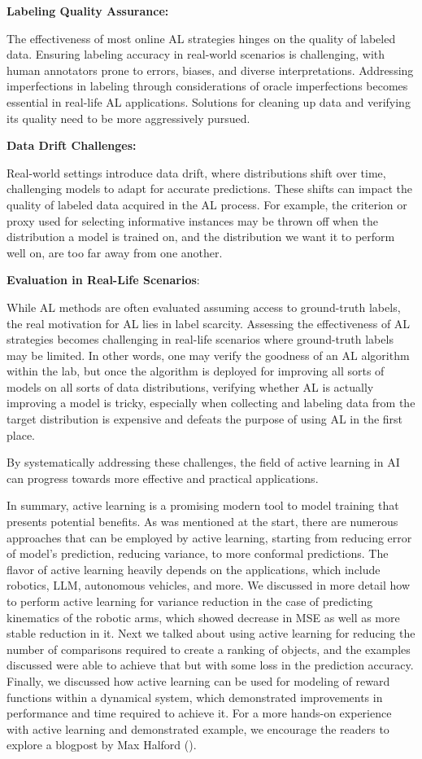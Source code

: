 \documentclass[
  letterpaper,
  numbers=noenddot,
  DIV=11]{scrreprt}
\theoremstyle{definition}
\theoremstyle{plain}
\theoremstyle{plain}
\theoremstyle{remark}
\begin{document}
\textbf{Labeling Quality Assurance:}

The effectiveness of most online AL strategies hinges on the quality of
labeled data. Ensuring labeling accuracy in real-world scenarios is
challenging, with human annotators prone to errors, biases, and diverse
interpretations. Addressing imperfections in labeling through
considerations of oracle imperfections becomes essential in real-life AL
applications. Solutions for cleaning up data and verifying its quality
need to be more aggressively pursued.

\textbf{Data Drift Challenges:}

Real-world settings introduce data drift, where distributions shift over
time, challenging models to adapt for accurate predictions. These shifts
can impact the quality of labeled data acquired in the AL process. For
example, the criterion or proxy used for selecting informative instances
may be thrown off when the distribution a model is trained on, and the
distribution we want it to perform well on, are too far away from one
another.

\textbf{Evaluation in Real-Life Scenarios}:

While AL methods are often evaluated assuming access to ground-truth
labels, the real motivation for AL lies in label scarcity. Assessing the
effectiveness of AL strategies becomes challenging in real-life
scenarios where ground-truth labels may be limited. In other words, one
may verify the goodness of an AL algorithm within the lab, but once the
algorithm is deployed for improving all sorts of models on all sorts of
data distributions, verifying whether AL is actually improving a model
is tricky, especially when collecting and labeling data from the target
distribution is expensive and defeats the purpose of using AL in the
first place.

By systematically addressing these challenges, the field of active
learning in AI can progress towards more effective and practical
applications.

In summary, active learning is a promising modern tool to model training
that presents potential benefits. As was mentioned at the start, there
are numerous approaches that can be employed by active learning,
starting from reducing error of model's prediction, reducing variance,
to more conformal predictions. The flavor of active learning heavily
depends on the applications, which include robotics, LLM, autonomous
vehicles, and more. We discussed in more detail how to perform active
learning for variance reduction in the case of predicting kinematics of
the robotic arms, which showed decrease in MSE as well as more stable
reduction in it. Next we talked about using active learning for reducing
the number of comparisons required to create a ranking of objects, and
the examples discussed were able to achieve that but with some loss in
the prediction accuracy. Finally, we discussed how active learning can
be used for modeling of reward functions within a dynamical system,
which demonstrated improvements in performance and time required to
achieve it. For a more hands-on experience with active learning and
demonstrated example, we encourage the readers to explore a blogpost by
Max Halford ().
\end{document}
